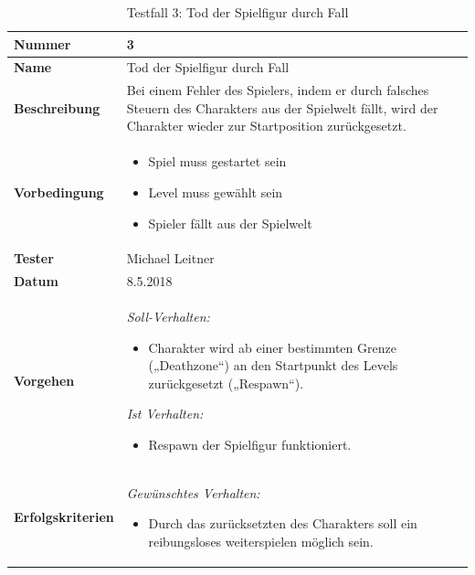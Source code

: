 \begin{table}

	\renewcommand{\arraystretch}{1.5}
	\begin{tabular}{|p{3.5cm}|p{11cm}|}
		
		\hline 
		\textbf{Nummer} & 3 \\ 
		\hline 
		\textbf{Name} & {\large Tod der Spielfigur durch Fall} \\ 
		\hline 
		\textbf{Beschreibung} & 
		Bei einem Fehler des Spielers, indem er durch falsches Steuern des Charakters aus der Spielwelt fällt, wird der Charakter wieder zur Startposition zurückgesetzt. \\ 
		\hline 
		\textbf{Vorbedingung} & 
		\begin{itemize}
			\setlength{\itemsep}{1pt}
			\setlength{\parskip}{0.5pt}
			\item Spiel muss gestartet sein
			\item Level muss gewählt sein
			\item Spieler fällt aus der Spielwelt
		\end{itemize} \\ 
		\hline 
		\textbf{Tester} & Michael Leitner \\ 
		\hline 
		\textbf{Datum} & 8.5.2018 \\ 
		\hline 
		\textbf{Vorgehen} & 
		\textit{Soll-Verhalten:}
		\begin{itemize}
			\setlength{\itemsep}{1pt}
			\setlength{\parskip}{0.5pt}
			\item Charakter wird ab einer bestimmten Grenze („Deathzone“) an den Startpunkt des Levels zurückgesetzt („Respawn“).\newline
		\end{itemize}  
		
		
		\textit{Ist Verhalten:}
		\begin{itemize}
			\setlength{\itemsep}{1pt}
			\setlength{\parskip}{0.5pt}
			\item Respawn der Spielfigur funktioniert. 
		\end{itemize}\\ 
		\hline 
		\textbf{Erfolgskriterien} & 
		\textit{Gewünschtes Verhalten:}
		\begin{itemize}
			\setlength{\itemsep}{1pt}
			\setlength{\parskip}{0.5pt}
			\item Durch das zurücksetzten des Charakters soll ein reibungsloses weiterspielen möglich sein.
		\end{itemize} \\ 
		\hline 
	\end{tabular} 
	\caption{Testfall 3: Tod der Spielfigur durch Fall}
\end{table}

